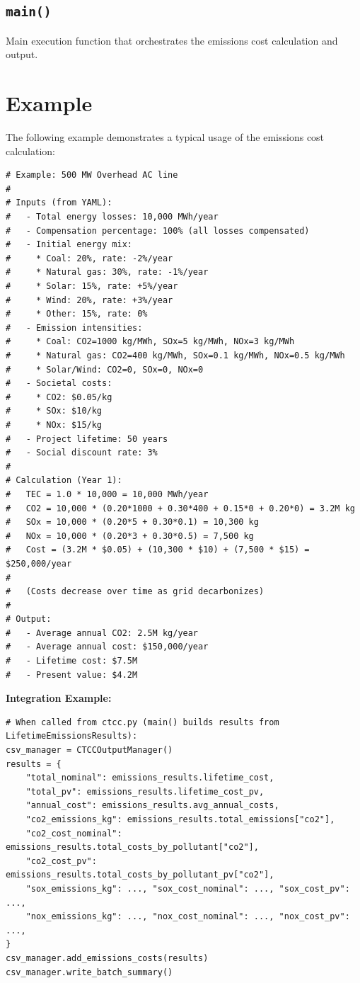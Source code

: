 \documentclass[ctcc_full_documentation.tex]{subfiles}
\begin{document}
\subsection{\texttt{main()}}

Main execution function that orchestrates the emissions cost calculation and output.

\section{Example}

The following example demonstrates a typical usage of the emissions cost calculation:

\begin{lstlisting}
# Example: 500 MW Overhead AC line
# 
# Inputs (from YAML):
#   - Total energy losses: 10,000 MWh/year
#   - Compensation percentage: 100% (all losses compensated)
#   - Initial energy mix:
#     * Coal: 20%, rate: -2%/year
#     * Natural gas: 30%, rate: -1%/year
#     * Solar: 15%, rate: +5%/year
#     * Wind: 20%, rate: +3%/year
#     * Other: 15%, rate: 0%
#   - Emission intensities:
#     * Coal: CO2=1000 kg/MWh, SOx=5 kg/MWh, NOx=3 kg/MWh
#     * Natural gas: CO2=400 kg/MWh, SOx=0.1 kg/MWh, NOx=0.5 kg/MWh
#     * Solar/Wind: CO2=0, SOx=0, NOx=0
#   - Societal costs:
#     * CO2: $0.05/kg
#     * SOx: $10/kg
#     * NOx: $15/kg
#   - Project lifetime: 50 years
#   - Social discount rate: 3%
#
# Calculation (Year 1):
#   TEC = 1.0 * 10,000 = 10,000 MWh/year
#   CO2 = 10,000 * (0.20*1000 + 0.30*400 + 0.15*0 + 0.20*0) = 3.2M kg
#   SOx = 10,000 * (0.20*5 + 0.30*0.1) = 10,300 kg
#   NOx = 10,000 * (0.20*3 + 0.30*0.5) = 7,500 kg
#   Cost = (3.2M * $0.05) + (10,300 * $10) + (7,500 * $15) = $250,000/year
#
#   (Costs decrease over time as grid decarbonizes)
#
# Output:
#   - Average annual CO2: 2.5M kg/year
#   - Average annual cost: $150,000/year
#   - Lifetime cost: $7.5M
#   - Present value: $4.2M
\end{lstlisting}

\textbf{Integration Example:}

\begin{lstlisting}
# When called from ctcc.py (main() builds results from LifetimeEmissionsResults):
csv_manager = CTCCOutputManager()
results = {
    "total_nominal": emissions_results.lifetime_cost,
    "total_pv": emissions_results.lifetime_cost_pv,
    "annual_cost": emissions_results.avg_annual_costs,
    "co2_emissions_kg": emissions_results.total_emissions["co2"],
    "co2_cost_nominal": emissions_results.total_costs_by_pollutant["co2"],
    "co2_cost_pv": emissions_results.total_costs_by_pollutant_pv["co2"],
    "sox_emissions_kg": ..., "sox_cost_nominal": ..., "sox_cost_pv": ...,
    "nox_emissions_kg": ..., "nox_cost_nominal": ..., "nox_cost_pv": ...,
}
csv_manager.add_emissions_costs(results)
csv_manager.write_batch_summary()
\end{lstlisting}
\end{document}
